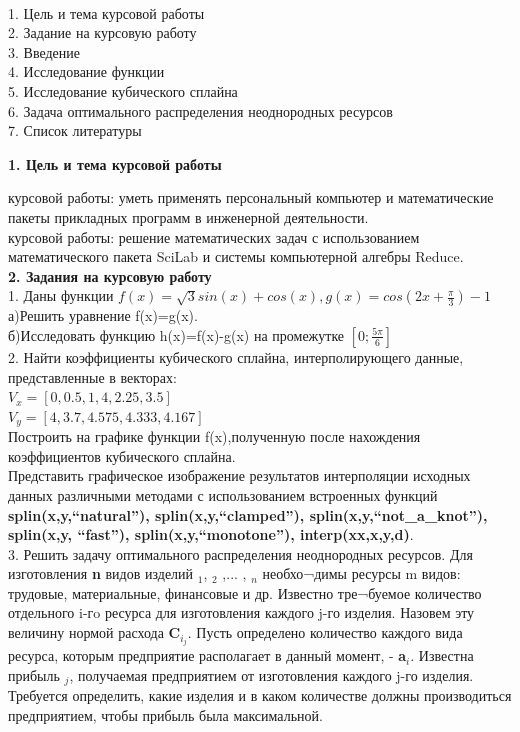 \documentclass[russian,utf8,nocolumnxxxi,nocolumnxxxii]{eskdtext}
\begin{document}
{}\\
1. Цель и тема курсовой работы\\
2. Задание на курсовую работу\\
3. Введение\\
4. Исследование функции\\
5. Исследование кубического сплайна\\
6. Задача оптимального распределения неоднородных ресурсов\\
7. Список литературы\\
\newpage

 {\large\bf 1. Цель и тема курсовой работы}

{ курсовой работы:} уметь применять персональный компьютер и математические пакеты прикладных программ в инженерной деятельности.\\
{ курсовой работы:} решение математических задач с использованием математического пакета SciLab и системы компьютерной алгебры Reduce.\\

\newpage
{\large\bf2. Задания на курсовую работу}\\
1. Даны функции $f(x)=\sqrt{3}sin(x)+cos(x),g(x)=cos(2x+\frac{\pi}{3})-1$\\
а)Решить уравнение f(x)=g(x).\\
б)Исследовать функцию h(x)=f(x)-g(x) на промежутке $[0;\frac{5\pi}{6}]$\\
2. Найти коэффициенты кубического сплайна, интерполирующего данные, представленные в векторах:\\
$V_{x}=[0,0.5,1,4,2.25,3.5]$\\
$V_{y}=[4,3.7,4.575,4.333,4.167]$\\
Построить на графике функции f(x),полученную после нахождения коэффициентов кубического сплайна. \\
Представить графическое изображение результатов интерполяции исходных данных различными методами с использованием встроенных функций {\bf splin(x,y,“natural”), splin(x,y,“clamped”), splin(x,y,“not\_a\_knot”), splin(x,y, “fast”), splin(x,y,“monotone”), interp(xx,x,y,d)}.\\
3. Решить задачу оптимального распределения неоднородных ресурсов.
Для изготовления {\bf n} видов изделий {$_1$}, {$_2$} ,... , {$_n$} необхо¬димы ресурсы m видов: трудовые, материальные, финансовые и др. Известно тре¬буемое количество отдельного i-гo ресурса для изготовления каждого j-го изделия. Назовем эту величину нормой расхода {\bf C$_i_j$}. Пусть определено количество каждого вида ресурса, которым предприятие располагает в данный момент, - {\bf a$_i$}. Известна прибыль {$_j$}, получаемая предприятием от изготовления каждого j-го изделия. Требуется определить, какие изделия и в каком количестве должны производиться предприятием, чтобы прибыль была максимальной. 
\end{document}
